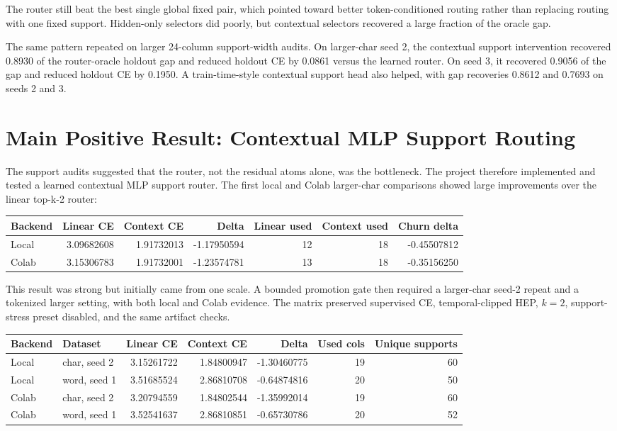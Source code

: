 \documentclass[11pt]{article}
\begin{document}
The router still beat the best single global fixed pair, which pointed toward
better token-conditioned routing rather than replacing routing with one fixed
support. Hidden-only selectors did poorly, but contextual selectors recovered a
large fraction of the oracle gap.

The same pattern repeated on larger 24-column support-width audits. On
larger-char seed 2, the contextual support intervention recovered 0.8930 of
the router-oracle holdout gap and reduced holdout CE by 0.0861 versus the
learned router. On seed 3, it recovered 0.9056 of the gap and reduced holdout
CE by 0.1950. A train-time-style contextual support head also helped, with gap
recoveries 0.8612 and 0.7693 on seeds 2 and 3.

\section{Main Positive Result: Contextual MLP Support Routing}

The support audits suggested that the router, not the residual atoms alone, was
the bottleneck. The project therefore implemented and tested a learned
contextual MLP support router. The first local and Colab larger-char
comparisons showed large improvements over the linear top-k-2 router:

\begin{center}
\begin{tabular}{lrrrrrr}
\toprule
Backend & Linear CE & Context CE & Delta & Linear used & Context used & Churn delta \\
\midrule
Local & 3.09682608 & 1.91732013 & -1.17950594 & 12 & 18 & -0.45507812 \\
Colab & 3.15306783 & 1.91732001 & -1.23574781 & 13 & 18 & -0.35156250 \\
\bottomrule
\end{tabular}
\end{center}

This result was strong but initially came from one scale. A bounded promotion
gate then required a larger-char seed-2 repeat and a tokenized larger setting,
with both local and Colab evidence. The matrix preserved supervised CE,
temporal-clipped HEP, \(k=2\), support-stress preset disabled, and the same
artifact checks.

\begin{center}
\begin{tabular}{llrrrrr}
\toprule
Backend & Dataset & Linear CE & Context CE & Delta & Used cols & Unique supports \\
\midrule
Local & char, seed 2 & 3.15261722 & 1.84800947 & -1.30460775 & 19 & 60 \\
Local & word, seed 1 & 3.51685524 & 2.86810708 & -0.64874816 & 20 & 50 \\
Colab & char, seed 2 & 3.20794559 & 1.84802544 & -1.35992014 & 19 & 60 \\
Colab & word, seed 1 & 3.52541637 & 2.86810851 & -0.65730786 & 20 & 52 \\
\bottomrule
\end{tabular}
\end{center}
\end{document}
